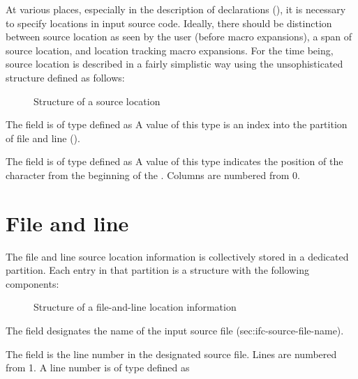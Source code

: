 \label{sec:ifc-source-location}

At various places, especially in the description of declarations (), it is necessary to specify 
locations in input source code.  Ideally, there should be distinction between source location as seen by the
user (before macro expansions), a span of source location, and location tracking macro expansions.
For the time being, source location is described in a fairly simplistic way using the unsophisticated
structure  defined as follows:
%
\begin{figure}[h]
	\centering
	\caption{Structure of a source location}
	\label{fig:ifc-source-location-structure}
\end{figure}


\noindent
The  field is of type  defined as 
A value of this type is an index into the partition of file and line ().

\noindent
The  field is of type  defined as 
A value of this type indicates the position of the character from the beginning of the .
Columns are numbered from 0.

\section{File and line}
\label{sec:ifc-file-and-line-location}

The file and line source location information is collectively stored in a dedicated partition.
Each entry in that partition is a structure with the following components:
%
\begin{figure}[h]
	\centering
	\caption{Structure of a file-and-line location information}
	\label{fig:ifc-file-and-line-structure}
\end{figure}
%
The  field designates the name of the input source file (sec:ifc-source-file-name).

\noindent
The  field is the line number in the designated source file. Lines are numbered from 1.
A line number is of type  defined as 

